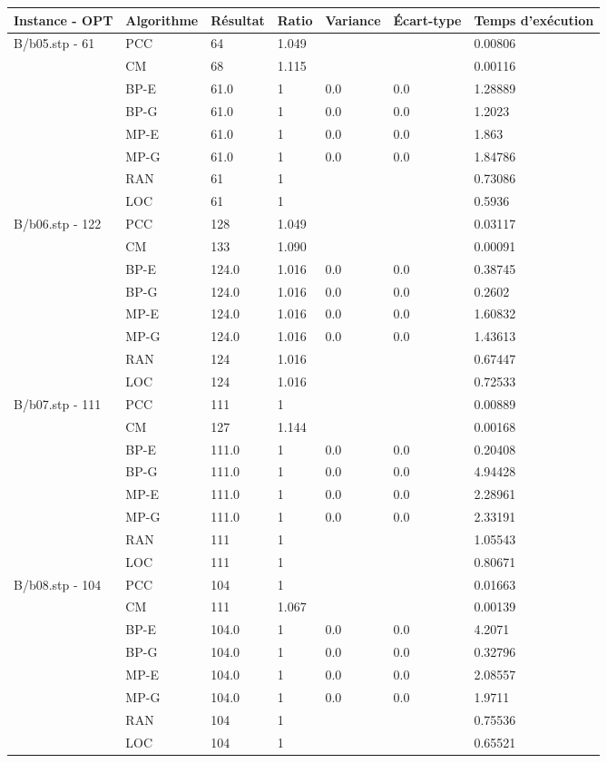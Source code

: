 \documentclass[12pt,a4paper]{article}
\begin{document}
\begin{center}
	\begin{tabular}{l|l|l|l|l|l|l}
		Instance - OPT & Algorithme & Résultat & Ratio & Variance & Écart-type & Temps d'exécution\\ \hline \hline
		B/b05.stp - 61&PCC&64&1.049&&&0.00806\\
		&CM&68&1.115&&&0.00116\\
		&BP-E&61.0&1&0.0&0.0&1.28889\\
		&BP-G&61.0&1&0.0&0.0&1.2023\\
		&MP-E&61.0&1&0.0&0.0&1.863\\
		&MP-G&61.0&1&0.0&0.0&1.84786\\
		&RAN&61&1&&&0.73086\\
		&LOC&61&1&&&0.5936\\\hline
		B/b06.stp - 122&PCC&128&1.049&&&0.03117\\
		&CM&133&1.090&&&0.00091\\
		&BP-E&124.0&1.016&0.0&0.0&0.38745\\
		&BP-G&124.0&1.016&0.0&0.0&0.2602\\
		&MP-E&124.0&1.016&0.0&0.0&1.60832\\
		&MP-G&124.0&1.016&0.0&0.0&1.43613\\
		&RAN&124&1.016&&&0.67447\\
		&LOC&124&1.016&&&0.72533\\\hline
		B/b07.stp - 111&PCC&111&1&&&0.00889\\
		&CM&127&1.144&&&0.00168\\
		&BP-E&111.0&1&0.0&0.0&0.20408\\
		&BP-G&111.0&1&0.0&0.0&4.94428\\
		&MP-E&111.0&1&0.0&0.0&2.28961\\
		&MP-G&111.0&1&0.0&0.0&2.33191\\
		&RAN&111&1&&&1.05543\\
		&LOC&111&1&&&0.80671\\\hline
		B/b08.stp - 104&PCC&104&1&&&0.01663\\
		&CM&111&1.067&&&0.00139\\
		&BP-E&104.0&1&0.0&0.0&4.2071\\
		&BP-G&104.0&1&0.0&0.0&0.32796\\
		&MP-E&104.0&1&0.0&0.0&2.08557\\
		&MP-G&104.0&1&0.0&0.0&1.9711\\
		&RAN&104&1&&&0.75536\\
		&LOC&104&1&&&0.65521\\\hline

\end{tabular}
\end{center}
\end{document}
